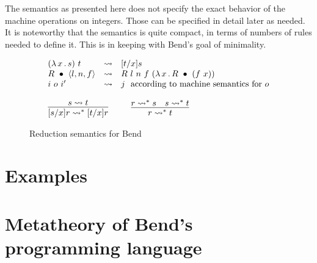 \documentclass{article}
\begin{document}
The semantics as presented here does not specify the exact behavior of the machine operations
on integers.  Those can be specified in detail later as needed.  It is noteworthy that the
semantics is quite compact, in terms of numbers of rules needed to define it.  This is
in keeping with Bend's goal of minimality.

\begin{figure}
  \[
\begin{array}{l}
  \begin{array}{lll}
    (\lam{x}{s})\ t & \leadsto & [t/x]s \\
    \wrec{R}{\ctor{l}{n}{f}} & \leadsto & R\ l\ n\ f\ (\lam{x}{\wrec{R}{(f\ x)}}) \\
    i\ o\ i' & \leadsto & j\ \ \textnormal{according to machine semantics for }o
  \end{array}
  \\ \\
  \begin{array}{lll}
  \infer{[s/x]r \leadsto^* [t/x]r}{s \leadsto t} &\ \ &
  \infer{r \leadsto^* t}{r \leadsto^* s & s \leadsto^* t}
  \end{array}
\end{array}  
\]
  \caption{Reduction semantics for Bend}
  \label{fig:opsem}
  \end{figure}

\section{Examples}


\section{Metatheory of Bend's programming language}
\label{sec:opmeta}



\end{document}
